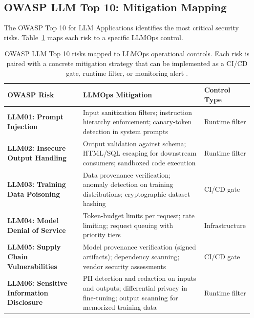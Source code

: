 \subsection{OWASP LLM Top 10: Mitigation Mapping}\label{sec:ch11_owasp}

The OWASP Top 10 for LLM Applications identifies the most critical security risks. Table~\ref{tab:ch11_owasp_mapping} maps each risk to a specific LLMOps control.

\begin{table}[t]
\centering
\small
\caption{OWASP LLM Top 10 risks mapped to LLMOps operational controls. Each risk is paired with a concrete mitigation strategy that can be implemented as a CI/CD gate, runtime filter, or monitoring alert \cite{OWASP2024LLMTop10}.}
\label{tab:ch11_owasp_mapping}
\setlength{\tabcolsep}{6pt}
\renewcommand{\arraystretch}{1.3}
\begin{tabularx}{\linewidth}{@{}>{\raggedright\arraybackslash}p{3.8cm}>{\raggedright\arraybackslash}X>{\raggedright\arraybackslash}p{3.2cm}@{}}
\toprule
\rowcolor{gray!15}
\textbf{OWASP Risk} & \textbf{LLMOps Mitigation} & \textbf{Control Type} \\
\midrule
\textbf{LLM01: Prompt Injection} & Input sanitization filters; instruction hierarchy enforcement; canary-token detection in system prompts & Runtime filter \\
\addlinespace[2pt]
\textbf{LLM02: Insecure Output Handling} & Output validation against schema; HTML/SQL escaping for downstream consumers; sandboxed code execution & Runtime filter \\
\addlinespace[2pt]
\textbf{LLM03: Training Data Poisoning} & Data provenance verification; anomaly detection on training distributions; cryptographic dataset hashing & CI/CD gate \\
\addlinespace[2pt]
\textbf{LLM04: Model Denial of Service} & Token-budget limits per request; rate limiting; request queuing with priority tiers & Infrastructure \\
\addlinespace[2pt]
\textbf{LLM05: Supply Chain Vulnerabilities} & Model provenance verification (signed artifacts); dependency scanning; vendor security assessments & CI/CD gate \\
\addlinespace[2pt]
\textbf{LLM06: Sensitive Information Disclosure} & PII detection and redaction on inputs and outputs; differential privacy in fine-tuning; output scanning for memorized training data & Runtime filter \\

\end{tabularx}
\end{table}
